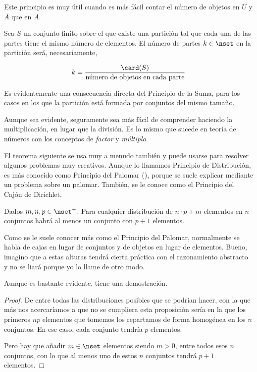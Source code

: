 Este principio es muy útil cuando es más fácil contar el número de objetos
en $U$ y $\overline{A}$ que en $A$.

\begin{theorem}
  Sea $S$ un conjunto finito sobre el que existe una partición tal que cada
  una de las partes tiene el mismo número de elementos. El número de partes
  $k \in \nset$ en la partición será, necesariamente,

  $$ k = \frac{\card(S)}{\text{número de objetos en cada parte}} $$
\end{theorem}

Es evidentemente una consecuencia directa del Principio de la Suma, para los
casos en los que la partición está formada por conjuntos del mismo tamaño.

Aunque sea evidente, seguramente sea más fácil de comprender haciendo la
multiplicación, en lugar que la división. Es lo mismo que sucede en teoría
de números con los conceptos de \emph{factor} y \emph{múltiplo}.

El teorema siguiente se usa muy a menudo también y puede usarse para
resolver algunos problemas muy creativos. Aunque lo llamamos Principio de
Distribución, es más conocido como Principio del Palomar (), porque se suele explicar mediante un problema sobre un palomar.
También, se le conoce como el Principio del Cajón de Dirichlet.

\begin{theorem}\label{princ-distribucion}
  Dados $m, n, p \in \nset^{+}$. Para cualquier distribución de $n \cdot p +
  m$ elementos en $n$ conjuntos habrá al menos un conjunto con $p + 1$
  elementos.
\end{theorem}

Como se le suele conocer más como el Principio del Palomar, normalmente se
habla de cajas en lugar de conjuntos y de objetos en lugar de elementos.
Bueno, imagino que a estas alturas tendrá cierta práctica con el
razonamiento abstracto y no se liará porque yo lo llame de otro modo.

Aunque es bastante evidente, tiene una demostración.

\begin{proof}
  De entre todas las distribuciones posibles que se podrían hacer, con la
  que más nos acercaríamos a que no se cumpliera esta proposición sería en
  la que los primeros $np$ elementos que tomemos los repartamos de forma
  homogénea en los $n$ conjuntos. En ese caso, cada conjunto tendría $p$
  elementos.

  Pero hay que añadir $m \in \nset$ elementos siendo $m > 0$, entre todos
  esos $n$ conjuntos, con lo que al menos uno de estos $n$ conjuntos tendrá
  $p+1$ elementos.
\end{proof}

